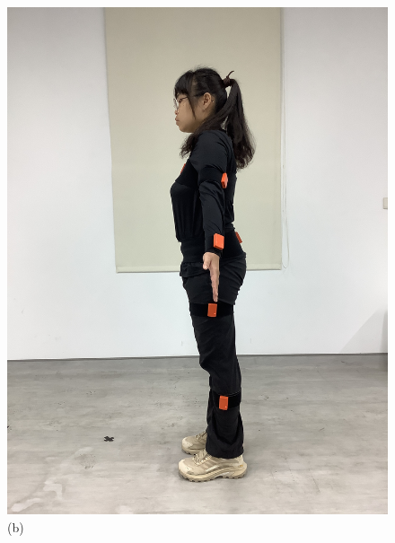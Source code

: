 \begin{figure}[!ht]
\begin{minipage}{.25\textwidth}
      \includegraphics[width=\linewidth, angle=-90]{figure/ch3_fig_leftimu.JPG}
      \caption*{(b)}
   \end{minipage}%
   \begin{minipage}{.25\textwidth}
      \centering

\end{minipage}
\end{figure}
